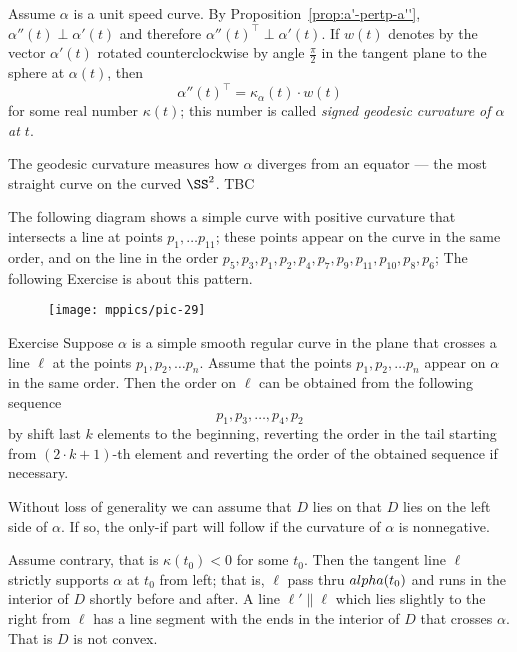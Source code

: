 Assume $\alpha$ is a unit speed curve.
By Proposition~\ref{prop:a'-pertp-a''}, $\alpha''(t)\perp\alpha'(t)$ and therefore $\alpha''(t)^\top\perp\alpha'(t)$.
If $w(t)$ denotes by the vector $\alpha'(t)$ rotated
counterclockwise by angle $\tfrac\pi2$ in the tangent plane to the sphere at $\alpha(t)$, then 
\[\alpha''(t)^\top=\kappa_\alpha(t)\cdot w(t)\]
for some real number $\kappa(t)$;
this number is called \emph{signed geodesic curvature of $\alpha$ at $t$}.

The geodesic curvature measures how $\alpha$ diverges from an equator --- the most straight curve on the curved $\SS^2$.
TBC














The following diagram shows a simple curve with positive curvature that intersects a line at points $p_1,\dots p_11$; these points appear on the curve in the same order, and on the line  in the order $p_5,p_3,p_1,p_2,p_4,p_7,p_9,p_{11},p_{10},p_8,p_6$; 
The following Exercise is about this pattern.

\begin{figure}[h!]
\vskip-0mm
\centering
\texttt{[image: mppics/pic-29]}
\vskip0mm
\end{figure}

\begin{thm}{Exercise}
Suppose $\alpha$ is a simple smooth regular curve in the plane that crosses a line $\ell$ at the points $p_1,p_2,\dots p_n$.
Assume that the points $p_1,p_2,\dots p_n$ appear on $\alpha$ in the same order.
Then the order on $\ell$ can be obtained from the following sequence 
\[p_1,p_3,\dots,p_4 ,p_2\]
by shift last $k$ elements to the beginning, reverting the order in the tail starting from $(2\cdot k+1)$-th element and reverting the order of the obtained sequence if necessary.
\end{thm}





Without loss of generality we can assume that $D$ lies on that $D$ lies on the left side of $\alpha$.
If so,
the only-if part will follow if the curvature of $\alpha$ is nonnegative.

Assume contrary, that is $\kappa(t_0)<0$ for some $t_0$.
Then the tangent line $\ell$ strictly supports $\alpha$ at $t_0$ from left;
that is, $\ell$ pass thru $\\alpha(t_0)$ and runs in the interior of $D$ shortly before and after.
A line $\ell'\parallel \ell$ which lies slightly to the right from $\ell$ has a line segment with the ends in the interior of $D$ that crosses $\alpha$.
That is $D$ is not convex.

